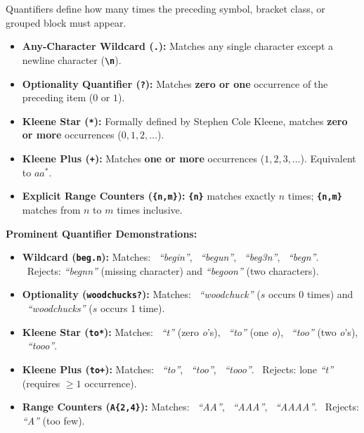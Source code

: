 \documentclass[10pt,a4paper]{article}
\newcommand{\rx}[1]{\texttt{\bfseries\color{inlinecode}#1}}
\newcommand{\cmark}{\textcolor{accentgreen}{\textbf{\checkmark}}}
\newcommand{\xmark}{\textcolor{accentred}{\textbf{\texttimes}}}
\begin{document}
\vspace{4pt}
\par\vspace{1pt}
Quantifiers define how many times the preceding symbol, bracket class, or grouped block must appear.

\begin{itemize}[leftmargin=12pt, itemsep=0.5pt, parsep=0pt, topsep=0.5pt]
    \item \textbf{Any-Character Wildcard (\rx{.}):} Matches any single character except a newline character (\rx{\textbackslash n}).
    \item \textbf{Optionality Quantifier (\rx{?}):} Matches \textbf{zero or one} occurrence of the preceding item ($0$ or $1$).
    \item \textbf{Kleene Star (\rx{*}):} Formally defined by Stephen Cole Kleene, matches \textbf{zero or more} occurrences ($0, 1, 2, \dots$).
    \item \textbf{Kleene Plus (\rx{+}):} Matches \textbf{one or more} occurrences ($1, 2, 3, \dots$). Equivalent to $aa^*$.
    \item \textbf{Explicit Range Counters (\rx{\{n,m\}}):} \rx{\{n\}} matches exactly $n$ times; \rx{\{n,m\}} matches from $n$ to $m$ times inclusive.
\end{itemize}

\vspace{-2pt}
\begin{examplebox}
\footnotesize
\textbf{Prominent Quantifier Demonstrations:}
\begin{itemize}[leftmargin=12pt, itemsep=1.5pt, parsep=0pt, topsep=1pt]
    \item \textbf{Wildcard (\rx{beg.n}):} Matches: \cmark\ \textit{``begin''}, \cmark\ \textit{``begun''}, \cmark\ \textit{``beg3n''}, \cmark\ \textit{``beg\textvisiblespace n''}. \xmark\ Rejects: \textit{``begnn''} (missing character) and \textit{``begoon''} (two characters).
    \item \textbf{Optionality (\rx{woodchucks?}):} Matches: \cmark\ \textit{``woodchuck''} ($s$ occurs 0 times) and \cmark\ \textit{``woodchucks''} ($s$ occurs 1 time).
    \item \textbf{Kleene Star (\rx{to*}):} Matches: \cmark\ \textit{``t''} (zero \textit{o}'s), \cmark\ \textit{``to''} (one \textit{o}), \cmark\ \textit{``too''} (two \textit{o}'s), \cmark\ \textit{``tooo''}.
    \item \textbf{Kleene Plus (\rx{to+}):} Matches: \cmark\ \textit{``to''}, \cmark\ \textit{``too''}, \cmark\ \textit{``tooo''}. \xmark\ Rejects: lone \textit{``t''} (requires $\ge 1$ occurrence).
    \item \textbf{Range Counters (\rx{A\{2,4\}}):} Matches: \cmark\ \textit{``AA''}, \cmark\ \textit{``AAA''}, \cmark\ \textit{``AAAA''}. \xmark\ Rejects: \textit{``A''} (too few).
\end{itemize}
\end{examplebox}
\end{document}
